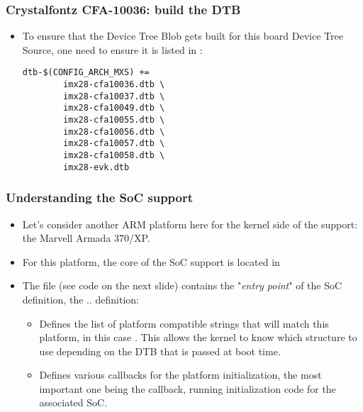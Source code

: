\begin{frame}[fragile]
  \frametitle{Crystalfontz CFA-10036: build the DTB}
  \begin{itemize}
  \item To ensure that the Device Tree Blob gets built for this board
    Device Tree Source, one need to ensure it is listed in
    :
    \begin{block}{}
      \begin{verbatim}
dtb-$(CONFIG_ARCH_MXS) +=
        imx28-cfa10036.dtb \
        imx28-cfa10037.dtb \
        imx28-cfa10049.dtb \
        imx28-cfa10055.dtb \
        imx28-cfa10056.dtb \
        imx28-cfa10057.dtb \
        imx28-cfa10058.dtb \
        imx28-evk.dtb
      \end{verbatim}
    \end{block}
  \end{itemize}
\end{frame}

\begin{frame}
  \frametitle{Understanding the SoC support}
  \begin{itemize}
  \item Let's consider another ARM platform here for the kernel side of
    the support: the Marvell Armada 370/XP.
  \item For this platform, the core of the SoC support is located in
  \item The  file (see code on the next slide)
    contains the "{\em entry point}" of the SoC definition, the
     ..  definition:
    \begin{itemize}
    \item Defines the list of platform compatible strings that will
      match this platform, in this case
      . This allows the kernel to know
      which \code{DT_MACHINE} structure to use depending on the DTB
      that is passed at boot time.
    \item Defines various callbacks for the platform initialization,
      the most important one being the  callback,
      running initialization code for the associated SoC.
    \end{itemize}
  \end{itemize}
\end{frame}


